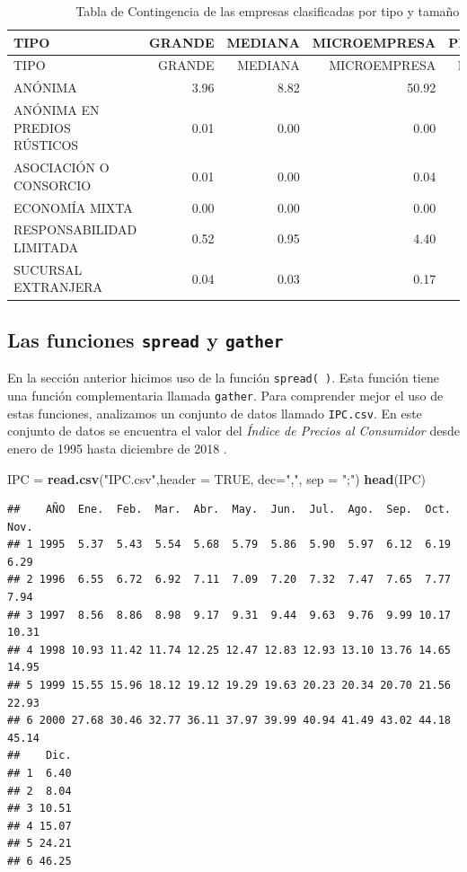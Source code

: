 \documentclass[letterpaper,]{book}
\newenvironment{Shaded}{\begin{snugshade}}{\end{snugshade}}
\newcommand{\DataTypeTok}[1]{\textcolor[rgb]{0.13,0.29,0.53}{#1}}
\newcommand{\KeywordTok}[1]{\textcolor[rgb]{0.13,0.29,0.53}{\textbf{#1}}}
\newcommand{\NormalTok}[1]{#1}
\newcommand{\OtherTok}[1]{\textcolor[rgb]{0.56,0.35,0.01}{#1}}
\newcommand{\StringTok}[1]{\textcolor[rgb]{0.31,0.60,0.02}{#1}}
\begin{document}
\begin{longtable}[]{@{}lrrrr@{}}
\caption{\label{tab:contpeqporc}Tabla de Contingencia de las empresas clasificadas por tipo y tamaño}\tabularnewline
\toprule
TIPO & GRANDE & MEDIANA & MICROEMPRESA & PEQUEÑA\tabularnewline
\midrule
\endfirsthead
\toprule
TIPO & GRANDE & MEDIANA & MICROEMPRESA & PEQUEÑA\tabularnewline
\midrule
\endhead
ANÓNIMA & 3.96 & 8.82 & 50.92 & 27.42\tabularnewline
ANÓNIMA EN PREDIOS RÚSTICOS & 0.01 & 0.00 & 0.00 & 0.03\tabularnewline
ASOCIACIÓN O CONSORCIO & 0.01 & 0.00 & 0.04 & 0.02\tabularnewline
ECONOMÍA MIXTA & 0.00 & 0.00 & 0.00 & 0.00\tabularnewline
RESPONSABILIDAD LIMITADA & 0.52 & 0.95 & 4.40 & 2.60\tabularnewline
SUCURSAL EXTRANJERA & 0.04 & 0.03 & 0.17 & 0.04\tabularnewline
\bottomrule
\end{longtable}

\newpage

\hypertarget{las-funciones-spread-y-gather}{%
\subsection{\texorpdfstring{Las funciones \texttt{spread} y \texttt{gather}}{Las funciones spread y gather}}\label{las-funciones-spread-y-gather}}

En la sección anterior hicimos uso de la función \texttt{spread(\ )}. Esta función tiene una función complementaria llamada \texttt{gather}. Para comprender mejor el uso de estas funciones, analizamos un conjunto de datos llamado \texttt{IPC.csv}. En este conjunto de datos se encuentra el valor del \emph{Índice de Precios al Consumidor} desde enero de 1995 hasta diciembre de 2018 \citep{msdr2017}.

\begin{Shaded}
\begin{Highlighting}[]
\NormalTok{IPC =}\StringTok{ }\KeywordTok{read.csv}\NormalTok{(}\StringTok{"IPC.csv"}\NormalTok{,}\DataTypeTok{header =} \OtherTok{TRUE}\NormalTok{, }\DataTypeTok{dec=}\StringTok{","}\NormalTok{, }\DataTypeTok{sep =} \StringTok{";"}\NormalTok{)}
\KeywordTok{head}\NormalTok{(IPC)}
\end{Highlighting}
\end{Shaded}

\begin{verbatim}
##    AÑO  Ene.  Feb.  Mar.  Abr.  May.  Jun.  Jul.  Ago.  Sep.  Oct.  Nov.
## 1 1995  5.37  5.43  5.54  5.68  5.79  5.86  5.90  5.97  6.12  6.19  6.29
## 2 1996  6.55  6.72  6.92  7.11  7.09  7.20  7.32  7.47  7.65  7.77  7.94
## 3 1997  8.56  8.86  8.98  9.17  9.31  9.44  9.63  9.76  9.99 10.17 10.31
## 4 1998 10.93 11.42 11.74 12.25 12.47 12.83 12.93 13.10 13.76 14.65 14.95
## 5 1999 15.55 15.96 18.12 19.12 19.29 19.63 20.23 20.34 20.70 21.56 22.93
## 6 2000 27.68 30.46 32.77 36.11 37.97 39.99 40.94 41.49 43.02 44.18 45.14
##    Dic.
## 1  6.40
## 2  8.04
## 3 10.51
## 4 15.07
## 5 24.21
## 6 46.25
\end{verbatim}
\end{document}
